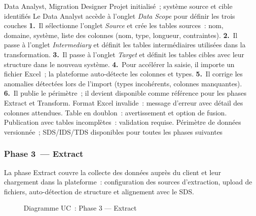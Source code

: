   {Data Analyst, Migration Designer}
  {Projet initialisé~; système source et cible identifiés}
  {Le Data Analyst accède à l'onglet \textit{Data Scope} pour définir les trois couches}
  {\textbf{1.}~Il sélectionne l'onglet \textit{Source} et crée les tables sources~: nom, domaine, système, liste des colonnes (nom, type, longueur, contraintes).\newline
   \textbf{2.}~Il passe à l'onglet \textit{Intermediary} et définit les tables intermédiaires utilisées dans la transformation.\newline
   \textbf{3.}~Il passe à l'onglet \textit{Target} et définit les tables cibles avec leur structure dans le nouveau système.\newline
   \textbf{4.}~Pour accélérer la saisie, il importe un fichier Excel~; la plateforme auto-détecte les colonnes et types.\newline
   \textbf{5.}~Il corrige les anomalies détectées lors de l'import (types incohérents, colonnes manquantes).\newline
   \textbf{6.}~Il publie le périmètre~; il devient disponible comme référence pour les phases Extract et Transform.}
  {Format Excel invalide~: message d'erreur avec détail des colonnes attendues. Table en doublon~: avertissement et option de fusion. Publication avec tables incomplètes~: validation requise.}
  {Périmètre de données versionnée~; SDS/IDS/TDS disponibles pour toutes les phases suivantes}
\fi %

\iffalse %
\subsubsection*{Phase 3~--- Extract}
\label{subsubsec:uc-phase3}

La phase Extract couvre la collecte des données auprès du client et leur chargement dans la plateforme~: configuration des sources d'extraction, upload de fichiers, auto-détection de structure et alignement avec le SDS.

\begin{figure}[H]
\centering
{}
\caption{Diagramme UC~: Phase 3 — Extract}
\label{fig:uc-phase3}
\end{figure}


